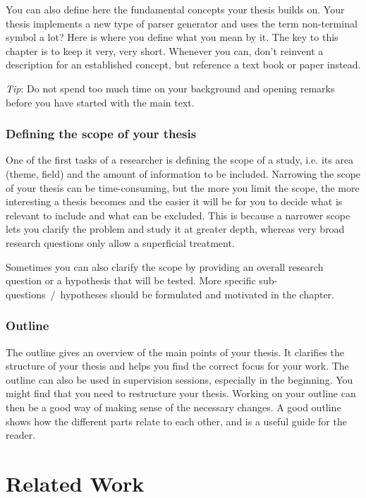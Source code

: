 You can also define here the fundamental concepts your thesis builds on. Your thesis implements a new type of parser generator and uses the term non-terminal symbol a lot? Here is where you define what you mean by it. The key to this chapter is to keep it very, very short. Whenever you can, don't reinvent a description for an established concept, but reference a text book or paper instead.
    
\emph{Tip}: Do not spend too much time on your background and opening remarks before you have started with the main text.

\subsection{Defining the scope of your thesis}
One of the first tasks of a researcher is defining the scope of a study, i.e. its area (theme, field) and the amount of information to be included. Narrowing the scope of your thesis can be time-consuming, but the more you limit the scope, the more interesting a thesis becomes and the easier it will be for you to decide what is relevant to include and what can be excluded. This is because a narrower scope lets you clarify the problem and study it at greater depth, whereas very broad research questions only allow a superficial treatment.

Sometimes you can also clarify the scope by providing an overall research question or a hypothesis that will be tested. More specific sub-questions~/~hypotheses should be formulated and motivated in the  chapter.
    
\subsection{Outline}
The outline gives an overview of the main points of your thesis. It clarifies the structure of your thesis and helps you find the correct focus for your work. The outline can also be used in supervision sessions, especially in the beginning. You might find that you need to restructure your thesis. Working on your outline can then be a good way of making sense of the necessary changes. A good outline shows how the different parts relate to each other, and is a useful guide for the reader.

\chapter{Related Work}
\label{chp:relatedwork}
